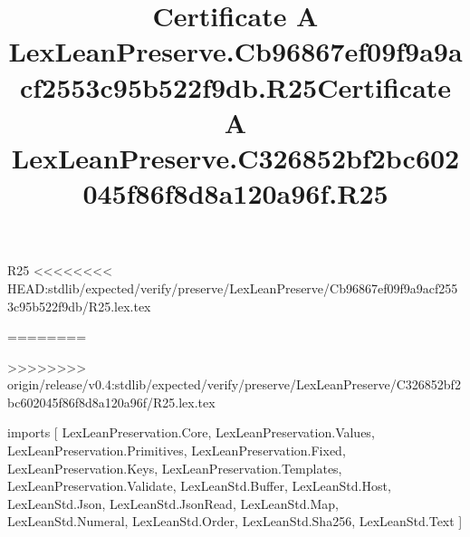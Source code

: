 \begin{lexlean}{R25}
<<<<<<<< HEAD:stdlib/expected/verify/preserve/LexLeanPreserve/Cb96867ef09f9a9acf2553c95b522f9db/R25.lex.tex
\title{Certificate A LexLeanPreserve.Cb96867ef09f9a9acf2553c95b522f9db.R25}
========
\title{Certificate A LexLeanPreserve.C326852bf2bc602045f86f8d8a120a96f.R25}
>>>>>>>> origin/release/v0.4:stdlib/expected/verify/preserve/LexLeanPreserve/C326852bf2bc602045f86f8d8a120a96f/R25.lex.tex
\begin{coremodule}
imports [
  LexLeanPreservation.Core,
  LexLeanPreservation.Values,
  LexLeanPreservation.Primitives,
  LexLeanPreservation.Fixed,
  LexLeanPreservation.Keys,
  LexLeanPreservation.Templates,
  LexLeanPreservation.Validate,
  LexLeanStd.Buffer,
  LexLeanStd.Host,
  LexLeanStd.Json,
  LexLeanStd.JsonRead,
  LexLeanStd.Map,
  LexLeanStd.Numeral,
  LexLeanStd.Order,
  LexLeanStd.Sha256,
  LexLeanStd.Text
]


\end{coremodule}
\end{lexlean}
